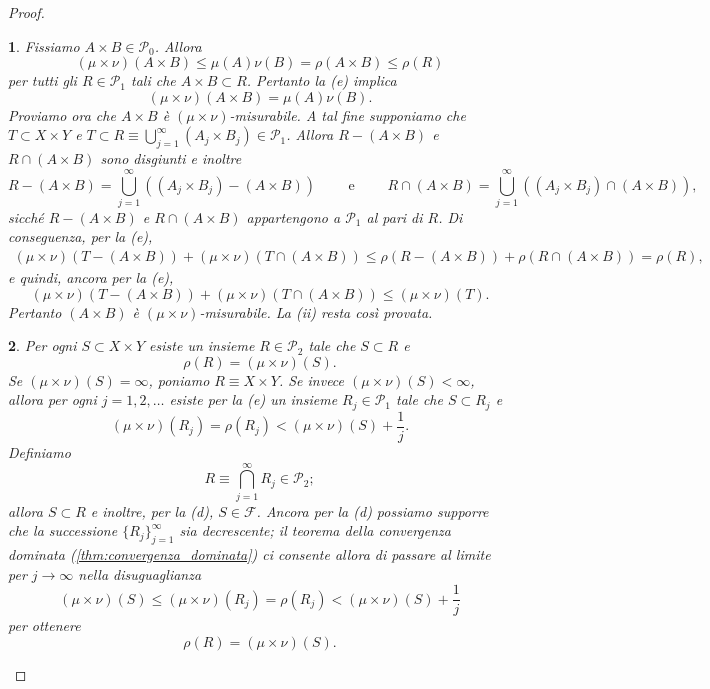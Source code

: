\documentclass[a4paper,10pt,openright,oneside]{book}
\theoremstyle{theoremstyle}
\theoremstyle{theoremstylewoheader}
\theoremstyle{theoremstyle}
\theoremstyle{proofsecstyle}
\newtheorem{proofsec}{}
\theoremstyle{nonumberplain}
\newtheorem{proof}{Dim.}
\newcommand{\FF}{\ensuremath{\mathcal{F}}}
\newcommand{\PP}{\ensuremath{\mathcal{P}}}
\begin{document}
\begin{proof}
\begin{proofsec}
Fissiamo $A \times B \in \PP_0$. Allora
\[
(\mu\times\nu)(A \times B) \le \mu(A)\nu(B) = \rho(A \times B) \le \rho(R)
\]
per tutti gli $R \in \PP_1$ tali che $A \times B \subset R$. Pertanto la (e) implica
\[
(\mu\times\nu)(A \times B) = \mu(A)\nu(B).
\]
Proviamo ora che $A \times B$ è $(\mu\times\nu)$-misurabile. A tal fine supponiamo che $T \subset X \times Y$ e $T \subset R \equiv \bigcup_{j=1}^\infty (A_j \times B_j) \in \PP_1$. Allora $R - (A \times B)$ e $R \cap (A \times B)$ sono disgiunti e inoltre
\[
R - (A \times B) = \bigcup_{j=1}^\infty ((A_j \times B_j) - (A \times B)) \qquad\text{ e }\qquad R \cap (A \times B) = \bigcup_{j=1}^\infty ((A_j \times B_j) \cap (A \times B)),
\]
sicché $R - (A \times B)$ e $R \cap (A \times B)$ appartengono a $\PP_1$ al pari di $R$. Di conseguenza, per la (e),
\begin{align*}
(\mu\times\nu)(T - (A \times B)) + (\mu\times\nu)(T \cap (A \times B)) \le \rho(R - (A \times B)) + \rho(R \cap (A \times B)) = \rho(R),
\end{align*}
e quindi, ancora per la (e),
\[
(\mu\times\nu)(T - (A \times B)) + (\mu\times\nu)(T \cap (A \times B)) \le (\mu\times\nu)(T).
\]
Pertanto $(A \times B)$ è $(\mu\times\nu)$-misurabile. La (ii) resta così provata.
\end{proofsec}

\begin{proofsec}
\emph{Per ogni $S \subset X \times Y$ esiste un insieme $R \in \PP_2$ tale che $S \subset R$ e}
\[
\rho(R) = (\mu\times\nu) (S).
\]
Se $(\mu\times\nu) (S) = \infty$, poniamo $R \equiv X \times Y$. Se invece $(\mu\times\nu) (S) < \infty$, allora per ogni $j = 1, 2, \ldots$ esiste per la (e) un insieme $R_j \in \PP_1$ tale che $S \subset R_j$ e
\[
(\mu\times\nu)(R_j) = \rho(R_j) < (\mu\times\nu) (S) + \frac{1}{j}.
\]
Definiamo 
\[
R \equiv \bigcap_{j=1}^{\infty} R_j \in \PP_2;
\]
allora $S \subset R$ e inoltre, per la (d), $S \in \FF$. Ancora per la (d) possiamo supporre che la successione $\{R_j\}_{j=1}^\infty$ sia \emph{decrescente}; il teorema della convergenza dominata (\ref{thm:convergenza_dominata}) ci consente allora di passare al limite per $j \to \infty$ nella disuguaglianza
\[
(\mu\times\nu)(S) \le (\mu\times\nu)(R_j) = \rho(R_j) < (\mu\times\nu)(S) + \frac{1}{j}
\]
per ottenere
\[
\rho(R) = (\mu\times\nu)(S).
\]
\end{proofsec}


\end{proof}
\end{document}
